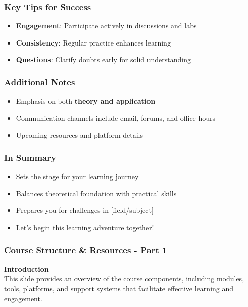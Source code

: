 \documentclass{beamer}
\begin{document}
\begin{frame}[fragile]
  \frametitle{Key Tips for Success}
  \begin{itemize}
    \item \textbf{Engagement}: Participate actively in discussions and labs
    \item \textbf{Consistency}: Regular practice enhances learning
    \item \textbf{Questions}: Clarify doubts early for solid understanding
  \end{itemize}
\end{frame}

\begin{frame}[fragile]
  \frametitle{Additional Notes}
  \begin{itemize}
    \item Emphasis on both \textbf{theory and application}
    \item Communication channels include email, forums, and office hours
    \item Upcoming resources and platform details
  \end{itemize}
\end{frame}

\begin{frame}[fragile]
  \frametitle{In Summary}
  \begin{itemize}
    \item Sets the stage for your learning journey
    \item Balances theoretical foundation with practical skills
    \item Prepares you for challenges in [field/subject]
    \item Let's begin this learning adventure together!
  \end{itemize}
\end{frame}

\begin{frame}[fragile]
    \frametitle{Course Structure & Resources - Part 1}
    \textbf{Introduction} \\
    This slide provides an overview of the course components, including modules, tools, platforms, and support systems that facilitate effective learning and engagement.
\end{frame}
\end{document}
